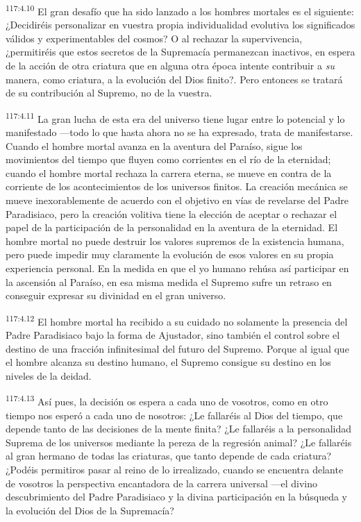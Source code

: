 \par
\textsuperscript{117:4.10} El gran desafío que ha sido lanzado a los hombres mortales es el siguiente: ¿Decidiréis personalizar en vuestra propia individualidad evolutiva los significados válidos y experimentables del cosmos? O al rechazar la supervivencia, ¿permitiréis que estos secretos de la Supremacía permanezcan inactivos, en espera de la acción de otra criatura que en alguna otra época intente contribuir a \textit{su} manera, como criatura, a la evolución del Dios finito?. Pero entonces se tratará de su contribución al Supremo, no de la vuestra.

\par
\textsuperscript{117:4.11} La gran lucha de esta era del universo tiene lugar entre lo potencial y lo manifestado ---todo lo que hasta ahora no se ha expresado, trata de manifestarse. Cuando el hombre mortal avanza en la aventura del Paraíso, sigue los movimientos del tiempo que fluyen como corrientes en el río de la eternidad; cuando el hombre mortal rechaza la carrera eterna, se mueve en contra de la corriente de los acontecimientos de los universos finitos. La creación mecánica se mueve inexorablemente de acuerdo con el objetivo en vías de revelarse del Padre Paradisiaco, pero la creación volitiva tiene la elección de aceptar o rechazar el papel de la participación de la personalidad en la aventura de la eternidad. El hombre mortal no puede destruir los valores supremos de la existencia humana, pero puede impedir muy claramente la evolución de esos valores en su propia experiencia personal. En la medida en que el yo humano rehúsa así participar en la ascensión al Paraíso, en esa misma medida el Supremo sufre un retraso en conseguir expresar su divinidad en el gran universo.

\par
\textsuperscript{117:4.12} El hombre mortal ha recibido a su cuidado no solamente la presencia del Padre Paradisiaco bajo la forma de Ajustador, sino también el control sobre el destino de una fracción infinitesimal del futuro del Supremo. Porque al igual que el hombre alcanza su destino humano, el Supremo consigue su destino en los niveles de la deidad.

\par
\textsuperscript{117:4.13} Así pues, la decisión os espera a cada uno de vosotros, como en otro tiempo nos esperó a cada uno de nosotros: ¿Le fallaréis al Dios del tiempo, que depende tanto de las decisiones de la mente finita? ¿Le fallaréis a la personalidad Suprema de los universos mediante la pereza de la regresión animal? ¿Le fallaréis al gran hermano de todas las criaturas, que tanto depende de cada criatura? ¿Podéis permitiros pasar al reino de lo irrealizado, cuando se encuentra delante de vosotros la perspectiva encantadora de la carrera universal ---el divino descubrimiento del Padre Paradisiaco y la divina participación en la búsqueda y la evolución del Dios de la Supremacía?

